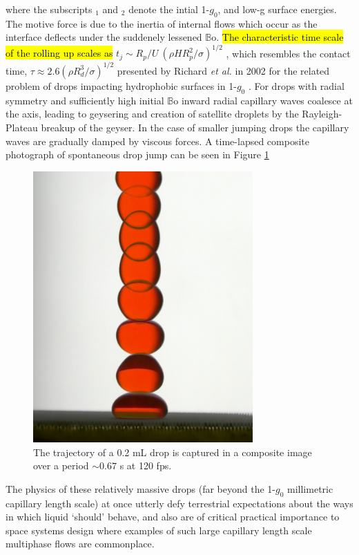 \documentclass[12pt,a4paper,oneside]{book}
\begin{document}
where the subscripts $_1$ and $_2$ denote the intial 1-$g_0$, and low-g surface energies. The motive force is due to the inertia of internal flows which occur as the interface deflects under the suddenely lessened $\mathbb{B}\mbox{o}$. \hl{The characteristic time scale of the rolling up scales as} $t_j \sim R_p/U ~(\rho H R^2_p/\sigma)^{1/2}$ \cite{attari_puddle_2016}, which resembles the contact time, $\tau \approx 2.6(\rho R^3_d/\sigma)^{1/2}$ presented by Richard \emph{et al.} in 2002 for the related problem of drops impacting hydrophobic surfaces in 1-$g_0$ \cite{richard_surface_2002}. For drops with radial symmetry and sufficiently high initial $\mathbb{B}\mbox{o}$ inward radial capillary waves coalesce at the axis, leading to geysering and creation of satellite droplets by the Rayleigh-Plateau breakup of the geyser. In the case of smaller jumping drops the capillary waves are gradually damped by viscous forces. A time-lapsed composite photograph of spontaneous drop jump can be seen in Figure \ref{fig:nobounce}
\begin{figure}[htb]
\centering
\includegraphics[width=0.75\textwidth]{drop_jump}
\caption{The trajectory of a 0.2 mL drop is captured in a composite image over a period $\sim 0.67$ s at 120 fps. \label{fig:nobounce}}
\end{figure}

The physics of these relatively massive drops (far beyond the 1-$g_0$ millimetric capillary length scale) at once utterly defy terrestrial expectations about the ways in which liquid `should' behave, and also are of critical practical importance to space systems design where examples of such large capillary length scale multiphase flows are commonplace.
\end{document}
